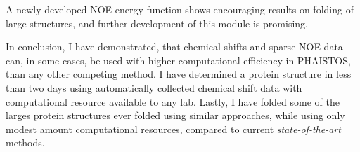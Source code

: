 A newly developed NOE energy function shows encouraging results on folding of large structures, and further development of this module is promising.


In conclusion, I have demonstrated, that chemical shifts and sparse NOE data can, in some cases, be used with higher computational efficiency in PHAISTOS, than any other competing method. I have determined a protein structure in less than two days using automatically collected chemical shift data with computational resource available to any lab.
Lastly, I have folded some of the larges protein structures ever folded using similar approaches, while using only modest amount computational resources, compared to current \textit{state-of-the-art} methods.
